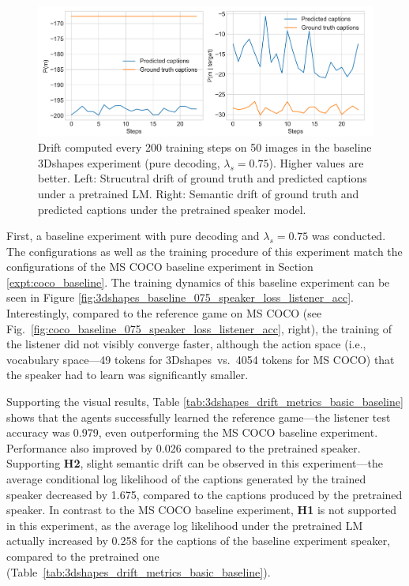 \begin{figure}
	\centering
	\includegraphics[width=\linewidth]{images/3dshapes_structural_semantic_drift_49_pure_075_random.png}
	\caption{Drift computed every 200 training steps on 50 images in the baseline 3Dshapes experiment (pure decoding, $\lambda_s = 0.75$). Higher values are better. Left: Strucutral drift of ground truth and predicted captions under a pretrained LM. Right: Semantic drift of ground truth and predicted captions under the pretrained speaker model.} 
	\label{fig:3dshapes_baseline_075_str_drift}
\end{figure}

First, a baseline experiment with pure decoding and $\lambda_s = 0.75$ was conducted.
The configurations as well as the training procedure of this experiment match the configurations of the MS COCO baseline experiment in Section \ref{expt:coco_baseline}. The training dynamics of this baseline experiment can be seen in Figure \ref{fig:3dshapes_baseline_075_speaker_loss_listener_acc}. Interestingly, compared to the reference game on MS COCO (see Fig.~\ref{fig:coco_baseline_075_speaker_loss_listener_acc}, right), the training of the listener did not visibly converge faster, although the action space (i.e., vocabulary space---49 tokens for 3Dshapes~vs.~4054 tokens for MS COCO) that the speaker had to learn was significantly smaller. 
 
Supporting the visual results, Table \ref{tab:3dshapes_drift_metrics_basic_baseline} shows that the agents successfully learned the reference game---the listener test accuracy was 0.979, even outperforming the MS COCO baseline experiment. Performance also improved by 0.026 compared to the pretrained speaker. 
Supporting \textbf{H2}, slight semantic drift can be observed in this experiment---the average conditional log likelihood of the captions generated by the trained speaker decreased by 1.675, compared to the captions produced by the pretrained speaker. In contrast to the MS COCO baseline experiment, \textbf{H1} is not supported in this experiment, as the average log likelihood under the pretrained LM actually increased by 0.258 for the captions of the baseline experiment speaker, compared to the pretrained one (Table~\ref{tab:3dshapes_drift_metrics_basic_baseline}).
 
